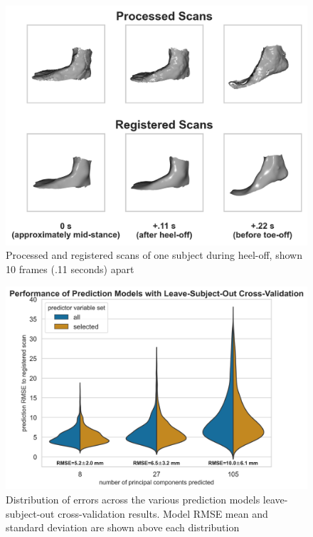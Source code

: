 \documentclass[preprint]{elsarticle}
\begin{document}
\newpage

\begin{figure}
\hypertarget{fig:scans}{%
\centering
\includegraphics[width=1\textwidth,height=\textheight]{fig/scans.png}
\caption{Processed and registered scans of one subject during heel-off, shown 10 frames (.11 seconds) apart}\label{fig:scans}
}
\end{figure}

\newpage

\begin{figure}
\hypertarget{fig:modelperf}{%
\centering
\includegraphics[width=1\textwidth,height=\textheight]{fig/modelPerformance.png}
\caption{Distribution of errors across the various prediction models leave-subject-out cross-validation results. Model RMSE mean and standard deviation are shown above each distribution}\label{fig:modelperf}
}
\end{figure}
\end{document}
